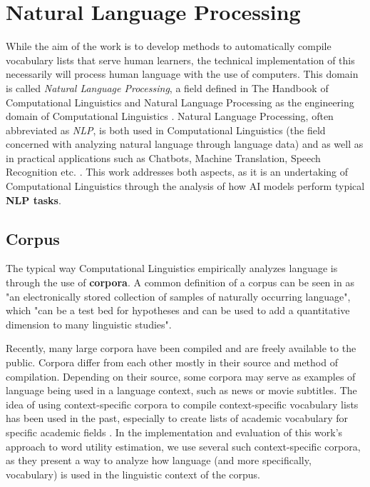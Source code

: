 \section{Natural Language Processing} \label{sec:natural-language-processing}
While the aim of the work is to develop methods to automatically compile vocabulary lists that serve human learners, the technical implementation of this necessarily will process human language with the use of computers.
This domain is called \textit{Natural Language Processing}, a field defined in The Handbook of Computational Linguistics and Natural Language Processing as the engineering domain of Computational Linguistics \cite{alexanderclarkHandbookComputationalLinguistics2010}.
Natural Language Processing, often abbreviated as \textit{NLP}, is both used in Computational Linguistics (the field concerned with analyzing natural language through language data) and as well as in practical applications such as Chatbots, Machine Translation, Speech Recognition etc. \cite{jurafskySpeechLanguageProcessing2025}.
This work addresses both aspects, as it is an undertaking of Computational Linguistics through the analysis of how AI models perform typical \textbf{NLP tasks}.

\subsection{Corpus}
The typical way Computational Linguistics empirically analyzes language is through the use of \textbf{corpora}.
A common definition of a corpus can be seen in \cite{hunstonCorpusLinguistics2006a} as "an electronically stored collection of samples of naturally occurring language", which "can be a test bed for hypotheses and can be used to add a quantitative dimension to many linguistic studies".

Recently, many large corpora have been compiled and are freely available to the public.
Corpora differ from each other mostly in their source and method of compilation.
Depending on their source, some corpora may serve as examples of language being used in a language context, such as news or movie subtitles.
The idea of using context-specific corpora to compile context-specific vocabulary lists has been used in the past, especially to create lists of academic vocabulary for specific academic fields \cite{xodabandeDevelopingValidatingMidfrequency2023} \cite{gholaminejadAcademicVocabularyCollocations2020}.
In the implementation and evaluation of this work's approach to word utility estimation, we use several such context-specific corpora, as they present a way to analyze how language (and more specifically, vocabulary) is used in the linguistic context of the corpus.

